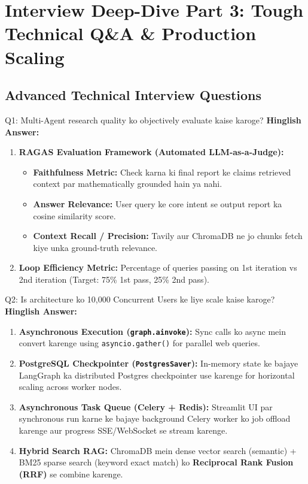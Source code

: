 \documentclass[9.5pt, a4paper]{article}
\begin{document}
\section{Interview Deep-Dive Part 3: Tough Technical Q\&A \& Production Scaling}

\subsection{Advanced Technical Interview Questions}

\begin{interviewbox}{Q1: Multi-Agent research quality ko objectively evaluate kaise karoge?}
\textbf{Hinglish Answer:}
\begin{enumerate}
    \item \textbf{RAGAS Evaluation Framework (Automated LLM-as-a-Judge):}
    \begin{itemize}
        \item \textbf{Faithfulness Metric:} Check karna ki final report ke claims retrieved context par mathematically grounded hain ya nahi.
        \item \textbf{Answer Relevance:} User query ke core intent se output report ka cosine similarity score.
        \item \textbf{Context Recall / Precision:} Tavily aur ChromaDB ne jo chunks fetch kiye unka ground-truth relevance.
    \end{itemize}
    \item \textbf{Loop Efficiency Metric:} Percentage of queries passing on 1st iteration vs 2nd iteration (Target: 75\% 1st pass, 25\% 2nd pass).
\end{enumerate}
\end{interviewbox}

\begin{interviewbox}{Q2: Is architecture ko 10,000 Concurrent Users ke liye scale kaise karoge?}
\textbf{Hinglish Answer:}
\begin{enumerate}
    \item \textbf{Asynchronous Execution (\texttt{graph.ainvoke}):} Sync calls ko async mein convert karenge using \texttt{asyncio.gather()} for parallel web queries.
    \item \textbf{PostgreSQL Checkpointer (\texttt{PostgresSaver}):} In-memory state ke bajaye LangGraph ka distributed Postgres checkpointer use karenge for horizontal scaling across worker nodes.
    \item \textbf{Asynchronous Task Queue (Celery + Redis):} Streamlit UI par synchronous run karne ke bajaye background Celery worker ko job offload karenge aur progress SSE/WebSocket se stream karenge.
    \item \textbf{Hybrid Search RAG:} ChromaDB mein dense vector search (semantic) + BM25 sparse search (keyword exact match) ko \textbf{Reciprocal Rank Fusion (RRF)} se combine karenge.
\end{enumerate}
\end{interviewbox}
\end{document}
